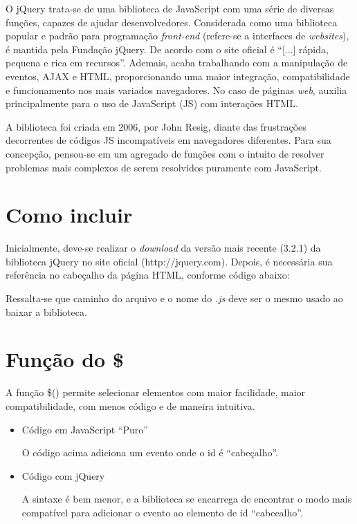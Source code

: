 \documentclass[12pt,a4paper]{article}
\begin{document}
O jQuery trata-se de uma biblioteca de JavaScript com uma série de diversas funções, capazes de ajudar desenvolvedores. Considerada como uma biblioteca popular e padrão para programação \textit{front-end} (refere-se a interfaces de \textit{websites}), é mantida pela Fundação jQuery. De acordo com o site oficial é “[...] rápida, pequena e rica em recursos”. Ademais, acaba trabalhando com a manipulação de eventos, AJAX e HTML, proporcionando uma maior integração, compatibilidade e funcionamento nos mais variados navegadores. No caso de páginas \textit{web}, auxilia principalmente para o uso de JavaScript (JS) com interações HTML.

A biblioteca foi criada em 2006, por John Resig, diante das frustrações decorrentes de códigos JS incompatíveis em navegadores diferentes. Para sua concepção, pensou-se em um agregado de funções com o intuito de resolver problemas mais complexos de serem resolvidos puramente com JavaScript.


\section{Como incluir}%

Inicialmente, deve-se realizar o \textit{download} da versão mais recente (3.2.1) da biblioteca jQuery no site oficial (http://jquery.com).
Depois, é necessária sua referência no cabeçalho da página HTML, conforme código abaixo:\vspace{0.3cm}

 

\vspace{0.3cm}
Ressalta-se que caminho do arquivo e o nome do \textit{.js} deve ser o mesmo usado ao baixar a biblioteca.

\section{Função do \$}

A função \$() permite selecionar elementos com maior facilidade, maior compatibilidade, com menos código e de maneira intuitiva.

\begin{itemize}
\item Código em JavaScript “Puro” \vspace{0.5cm}



O código acima adiciona um evento onde o id é “cabeçalho”. \vspace{0.5cm}

\item Código com jQuery \vspace{0.5cm}



A sintaxe é bem menor, e a biblioteca se encarrega de encontrar o modo mais compatível para adicionar o evento ao elemento de id “cabecalho”.

\end{itemize}
\end{document}
